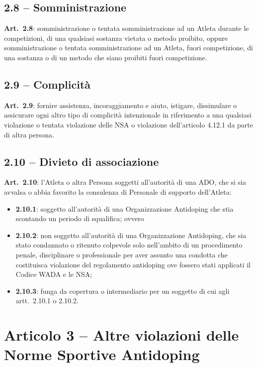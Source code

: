 \subsection{2.8 -- Somministrazione}

\textbf{Art.\ 2.8}: somministrazione o tentata somministrazione ad un Atleta durante le
competizioni, di una qualsiasi sostanza vietata o metodo proibito, oppure somministrazione o
tentata somministrazione ad un Atleta, fuori competizione, di una sostanza o di un metodo che
siano proibiti fuori competizione.

\subsection{2.9 -- Complicità}

\textbf{Art.\ 2.9}: fornire assistenza, incoraggiamento e aiuto, istigare, dissimulare o
assicurare ogni altro tipo di complicità intenzionale in riferimento a una qualsiasi violazione
o tentata violazione delle NSA o violazione dell'articolo 4.12.1 da parte di altra persona.

\subsection{2.10 -- Divieto di associazione}

\textbf{Art.\ 2.10}: l'Atleta o altra Persona soggetti all'autorità di una ADO, che si sia
avvalsa o abbia favorito la consulenza di Personale di supporto dell'Atleta:
\begin{itemize}
  \item \textbf{2.10.1}: soggetto all'autorità di una Organizzazione Antidoping che stia
    scontando un periodo di squalifica; ovvero
  \item \textbf{2.10.2}: non soggetto all'autorità di una Organizzazione Antidoping, che sia
    stato condannato o ritenuto colpevole solo nell'ambito di un procedimento penale,
    disciplinare o professionale per aver assunto una condotta che costituisca violazione del
    regolamento antidoping ove fossero stati applicati il Codice WADA e le NSA;
  \item \textbf{2.10.3}: funga da copertura o intermediario per un soggetto di cui agli artt.\
    2.10.1 o 2.10.2.
\end{itemize}

\section{Articolo 3 -- Altre violazioni delle Norme Sportive Antidoping}

